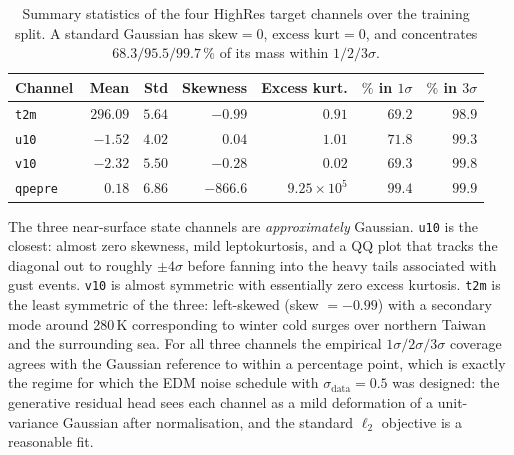 \begin{table}[htbp]
  \centering
  \caption[Gaussianity statistics of HighRes target channels]{Summary statistics of the four HighRes target channels over the training split. A standard Gaussian has $\text{skew}=0$, $\text{excess kurt}=0$, and concentrates $68.3/95.5/99.7\,\%$ of its mass within $1/2/3\sigma$.}
  \label{tab:highres-gaussian-stats}
  \small
  \begin{tabular}{lrrrrrr}
    \toprule
    Channel & Mean & Std & Skewness & Excess kurt. & $\%$ in $1\sigma$ & $\%$ in $3\sigma$ \\
    \midrule
    \texttt{t2m}    & $296.09$ & $5.64$ & $-0.99$   & $0.91$      & $69.2$ & $98.9$ \\
    \texttt{u10}    & $-1.52$  & $4.02$ & $\phantom{-}0.04$    & $1.01$      & $71.8$ & $99.3$ \\
    \texttt{v10}    & $-2.32$  & $5.50$ & $-0.28$   & $0.02$      & $69.3$ & $99.8$ \\
    \texttt{qpepre} & $\phantom{-}0.18$   & $6.86$ & $-866.6$  & $9.25\times10^{5}$ & $99.4$ & $99.9$ \\
    \bottomrule
  \end{tabular}
\end{table}

The three near-surface state channels are \emph{approximately} Gaussian. \texttt{u10} is the closest: almost zero skewness, mild leptokurtosis, and a QQ plot that tracks the diagonal out to roughly $\pm 4\sigma$ before fanning into the heavy tails associated with gust events. \texttt{v10} is almost symmetric with essentially zero excess kurtosis. \texttt{t2m} is the least symmetric of the three: left-skewed (skew $= -0.99$) with a secondary mode around 280\,K corresponding to winter cold surges over northern Taiwan and the surrounding sea. For all three channels the empirical $1\sigma/2\sigma/3\sigma$ coverage agrees with the Gaussian reference to within a percentage point, which is exactly the regime for which the EDM noise schedule with $\sigma_{\text{data}}=0.5$ was designed: the generative residual head sees each channel as a mild deformation of a unit-variance Gaussian after normalisation, and the standard $\ell_2$ objective is a reasonable fit.

